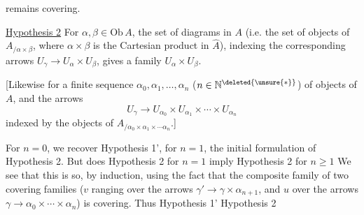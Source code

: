 
remains covering.

\uline{Hypothesis 2} For $\alpha,\beta\in\mathrm{Ob}\,A$, the set of  diagrams
\diagram{\begin{tikzcd}[ampersand replacement=\&,column sep=small,row sep=small]\&\alpha\\\gamma\arrow[ur]\arrow[dr]\&\\\&\beta\end{tikzcd}}
in $A$ (i.e. the set of objects of $A_{/\alpha\times\beta}$, where $\alpha\times\beta$ is the Cartesian product in $\widehat A$), indexing the corresponding arrows $U_\gamma\longrightarrow U_\alpha\times U_\beta$, gives a family  $U_\alpha\times U_\beta$.

[Likewise for a finite  sequence $\alpha_0,\alpha_1,\ldots,\alpha_n$ ($n\in\mathbb N^{\deleted{\unsure{*}}}$) of objects of $A$, and the  arrows
\[U_\gamma\longrightarrow U_{\alpha_0}\times U_{\alpha_1}\times\cdots\times U_{\alpha_n}\]
indexed by the objects of $A_{/\alpha_0\times\alpha_1\times\cdots\alpha_n}$.]

For $n=0$, we recover Hypothesis 1', for $n=1$, the initial formulation of Hypothesis 2. But does Hypothesis 2 for $n=1$ imply Hypothesis 2 for  $n\geq1$ We see that this is so, by induction, using the fact that the composite family of two covering families
($v$ ranging over the arrows $\gamma'\longrightarrow\gamma\times\alpha_{n+1}$, and $u$ over the arrows  $\gamma\longrightarrow\alpha_0\times\cdots\times\alpha_n$) is covering. Thus Hypothesis 1'  \inserted{$+$} Hypothesis 2
